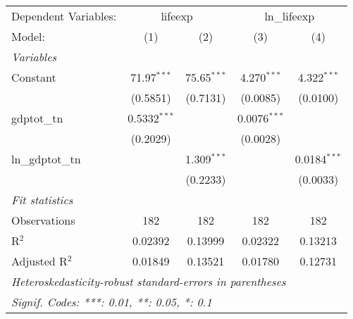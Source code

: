 
\begingroup
\centering
\begin{tabular}{lcccc}
   \tabularnewline \midrule \midrule
   Dependent Variables: & \multicolumn{2}{c}{lifeexp} & \multicolumn{2}{c}{ln\_lifeexp}\\
   Model:           & (1)            & (2)           & (3)            & (4)\\  
   \midrule
   \emph{Variables}\\
   Constant         & 71.97$^{***}$  & 75.65$^{***}$ & 4.270$^{***}$  & 4.322$^{***}$\\   
                    & (0.5851)       & (0.7131)      & (0.0085)       & (0.0100)\\   
   gdptot\_tn       & 0.5332$^{***}$ &               & 0.0076$^{***}$ &   \\   
                    & (0.2029)       &               & (0.0028)       &   \\   
   ln\_gdptot\_tn   &                & 1.309$^{***}$ &                & 0.0184$^{***}$\\   
                    &                & (0.2233)      &                & (0.0033)\\   
   \midrule
   \emph{Fit statistics}\\
   Observations     & 182            & 182           & 182            & 182\\  
   R$^2$            & 0.02392        & 0.13999       & 0.02322        & 0.13213\\  
   Adjusted R$^2$   & 0.01849        & 0.13521       & 0.01780        & 0.12731\\  
   \midrule \midrule
   \multicolumn{5}{l}{\emph{Heteroskedasticity-robust standard-errors in parentheses}}\\
   \multicolumn{5}{l}{\emph{Signif. Codes: ***: 0.01, **: 0.05, *: 0.1}}\\
\end{tabular}
\par\endgroup


